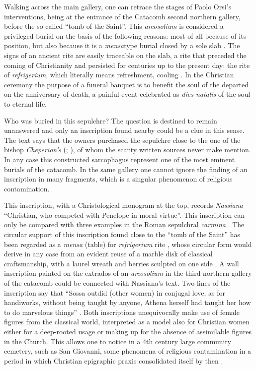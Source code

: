 \documentclass[amsthm,ebook]{saparticle}
\begin{document}
\noindent Walking across the main gallery, one can retrace the stages of Paolo Orsi’s interventions, being at the entrance of the Catacomb second northern gallery, before the so-called ``tomb of the Saint''. This \emph{arcosolium} is considered a privileged burial on the basis of the following reasons: most of all because of its position, but also because it is a \emph{mensa}type burial closed by a sole slab \citep[292-294]{ORSI1893}. The signs of an ancient rite are easily traceable on the slab, a rite that preceded the coming of Christianity and persisted for centuries up to the present day: the rite of \emph{refrigerium}, which literally means refreshment, cooling \citep{GIUNTELLA1985}. In the Christian ceremony the purpose of a funeral banquet is to benefit the soul of the departed on the anniversary of death, a painful event celebrated as \emph{dies natalis} of the soul to eternal life.

Who was buried in this sepulchre? The question is destined to remain unanswered and only an inscription found nearby could be a clue in this sense. The text says that the owners purchased the sepulchre close to the one of the bishop \emph{Cheperion’s} (\citealp[507-508]{ORSI1895ab}; \citealp[55-58]{RIZZONE2011}), of whom the scanty written sources never make mention. In any case this constructed sarcophagus represent one of the most eminent burials of the catacomb. In the same gallery one cannot ignore the finding of an inscription in many fragments, which is a singular phenomenon of religious contamination.

This inscription, with a Christological monogram at the top, records \emph{Nassiana} ``Christian, who competed with Penelope in moral virtue''. This inscription can only be compared with three examples in the Roman sepulchral \emph{carmina} \citep{CLE}. The circular support of this inscription found close to the ``tomb of the Saint'' has been regarded as a \emph{mensa} (table) for \emph{refrigerium} rite \citep[47]{GIUNTELLA1985}, whose circular form would derive in any case from an evident reuse of a marble disk of classical craftsmanship, with a laurel wreath and berries sculpted on one side \citep[n. 234]{ORSI1895ab}. A wall inscription painted on the extrados of an \emph{arcosolium} in the third northern gallery of the catacomb could be connected with Nassiana’s text. Two lines of the inscription say that ``Sossa outdid (other women) in conjugal love; as for handiworks, without being taught by anyone, Athena herself had taught her how to do marvelous things'' \citep[n. 3]{FERRUA1940}. Both inscriptions unequivocally make use of female figures from the classical world, interpreted as a model also for Christian women either for a deep-rooted usage or making up for the absence of assimilable figures in the Church. This allows one to notice in a 4th century large community cemetery, such as San Giovanni, some phenomena of religious contamination in a period in which Christian epigraphic praxis consolidated itself by then \citep[484]{SGARLATA1999}.
\end{document}
